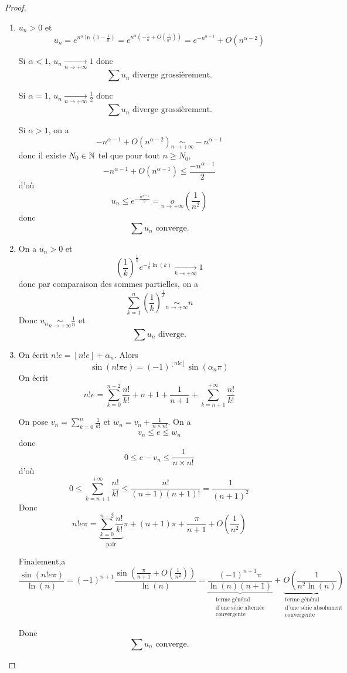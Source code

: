 \begin{proof}
	\phantom{}
	\begin{enumerate}
		\item $u_{n}>0$ et 
		$$u_{n}=e^{n^{\alpha}\ln\left(1-\frac{1}{n}\right)}=e^{n^{\alpha}\left(-\frac{1}{n}+O\left(\frac{1}{n^{2}}\right)\right)}=e^{-n^{\alpha-1}}+O\left(n^{\alpha-2}\right)$$

		Si $\alpha<1$, $u_{n}\xrightarrow[n\to+\infty]{}1$ donc 
		$$\boxed{\sum u_{n}\text{ diverge grossièrement.}}$$

		Si $\alpha=1$, $u_{n}\xrightarrow[n\to+\infty]{}\frac{1}{2}$ donc 
		$$\boxed{\sum u_{n}\text{ diverge grossièrement.}}$$

		Si $\alpha>1$, on a 
		$$-n^{\alpha-1}+O\left(n^{\alpha-2}\right)\underset{n\to+\infty}{\sim}-n^{\alpha-1}$$
		donc il existe $N_{0}\in\mathbb{N}$ tel que pour tout $n\geqslant N_{0}$,
		$$-n^{\alpha-1}+O\left(n^{\alpha-1}\right)\leqslant\frac{-n^{\alpha-1}}{2}$$
		d'où 
		$$u_{n}\leqslant e^{-\frac{n^{\alpha-1}}{2}}=\underset{n\to+\infty}{o}\left(\frac{1}{n^{2}}\right)$$
		donc 
		$$\boxed{\sum u_{n}\text{ converge.}}$$

		\item On a $u_{n}>0$ et 
		$$\left(\frac{1}{k}\right)^{\frac{1}{k}}e^{-\frac{1}{k}\ln(k)}\xrightarrow[k\to+\infty]{}1$$
		donc par comparaison des sommes partielles, on a 
		$$\sum_{k=1}^{n}\left(\frac{1}{k}\right)^{\frac{1}{k}}\underset{n\to+\infty}{\sim}n$$
		Donc $u_{n}\underset{n\to+\infty}{\sim}\frac{1}{n}$ et 
		$$\boxed{\sum u_{n}\text{ diverge.}}$$

		\item On écrit $n!e=\left\lfloor n!e\right\rfloor+\alpha_{n}$.
		Alors 
		$$\sin(n!\pi e)=(-1)^{\left\lfloor n!e\right\rfloor}\sin(\alpha_{n}\pi)$$
		On écrit 
		$$n!e=\sum_{k=0}^{n-2}\frac{n!}{k!}+n+1+\frac{1}{n+1}+\sum_{k=n+1}^{+\infty}\frac{n!}{k!}$$

		On pose $v_{n}=\sum_{k=0}^{n}\frac{1}{k!}$ et $w_{n}=v_{n}+\frac{1}{n\times n!}$. On a 
		$$v_{n}\leqslant e\leqslant w_{n}$$
		donc 
		$$0\leqslant e-v_{n}\leqslant\frac{1}{n\times n!}$$
		d'où
		$$0\leqslant \sum_{k=n+1}^{+\infty}\frac{n!}{k!}\leqslant\frac{n!}{(n+1)(n+1)!}=\frac{1}{(n+1)^{2}}$$
		Donc 
		$$n!e\pi = \underbrace{\sum_{k=0}^{n-2}\frac{n!}{k!}}_{\text{pair}}\pi+(n+1)\pi+\frac{\pi}{n+1}+O\left(\frac{1}{n^{2}}\right)$$

		Finalement,a
		$$\frac{\sin(n!e\pi)}{\ln(n)}=(-1)^{n+1}\frac{\sin\left(\frac{\pi}{n+1}+O\left(\frac{1}{n^{2}}\right)\right)}{\ln(n)}=\underbrace{\frac{(-1)^{n+1}\pi}{\ln(n)(n+1)}}_{\substack{\text{terme général}\\\text{d'une série alternée}\\\text{convergente}}}+\underbrace{O\left(\frac{1}{n^{2}\ln(n)}\right)}_{\substack{\text{terme général}\\\text{d'une série absolument}\\\text{convergente}}}$$

		Donc 
		$$\boxed{\sum u_{n}\text{ converge.}}$$
	\end{enumerate}
\end{proof}

